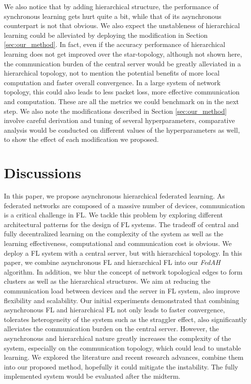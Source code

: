 \documentclass[10pt,twocolumn,letterpaper]{article}
\theoremstyle{definition}
\begin{document}
We also notice that by adding hierarchical structure, the performance of synchronous learning gets hurt quite a bit, while that of its asynchronous counterpart is not that obvious. We also expect the unstableness of hierarchical learning could be alleviated by deploying the modification in Section \ref{sec:our_method}. In fact, even if the accuracy performance of hierarchical learning does not get improved over the star-topology, although not shown here, the communication burden of the central server would be greatly alleviated in a hierarchical topology, not to mention the potential benefits of more local computation and faster overall convergence. In a large system of network topology, this could also leads to less packet loss, more effective communication and computation. These are all the metrics we could benchmark on in the next step. We also note the modifications described in Section \ref{sec:our_method} involve careful derivation and tuning of several hyperparameters, comparative analysis would be conducted on different values of the hyperparameters as well, to show the effect of each modification we proposed.


\section{Discussions}

In this paper, we propose asynchronous hierarchical federated learning. 
As federated networks are composed of a massive number of devices, communication is a critical challenge in FL. We tackle this problem by exploring different architectural patterns for the design of FL systems. The tradeoff of central and fully decentralized learning on the complexity of the system as well as the learning effectiveness, computational and communication cost is obvious. We deploy a FL system with a central server, but with hierarchical topology. In this paper, we combine asynchronous FL and hierarchical FL into our \textit{FedAH} algorithm. In addition, we blur the concept of network topological edges to form clusters as well as the hierarchical structures. We aim at reducing the communication load between devices and the server in FL system, also improve flexibility and scalability. Our initial experiments demonstrated that combining asynchronous FL and hierarchical FL not only leads to faster convergence, tolerates heterogeneity of the system such as the straggler effect, also significantly alleviates the communication burden on the central server. However, the asynchronous and hierarchical nature greatly increases the complexity of the system, especially on the communication topology, which could lead to unstable learning. 
We explored the literature and recent research advances, combine them into our proposed method, hopefully it could mitigate the instability. The fully implemented system would be evaluated after the midterm.
\end{document}
